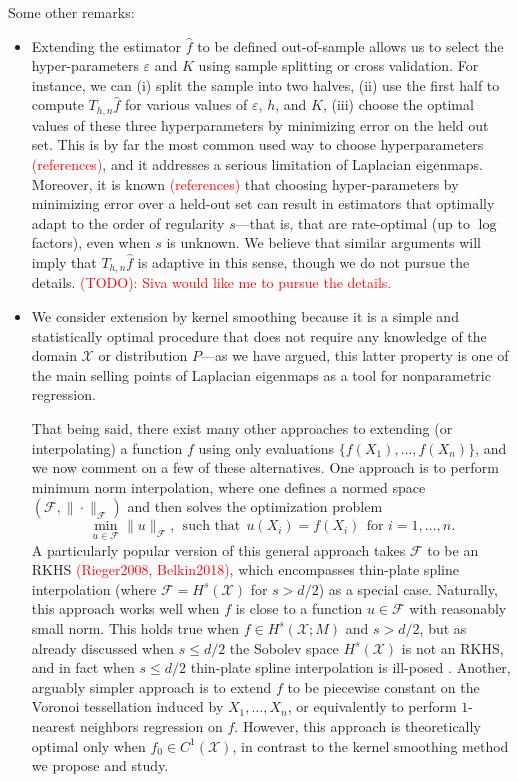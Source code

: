 \documentclass{article}
\newcommand{\1}{\mathbf{1}}
\newcommand{\mc}[1]{\mathcal{#1}}
\newcommand{\wh}[1]{\widehat{#1}}
\theoremstyle{alden}
\theoremstyle{aldenthm}
\theoremstyle{definition}
\theoremstyle{remark}
\begin{document}
Some other remarks:
\begin{itemize}
	\item Extending the estimator $\wh{f}$ to be defined out-of-sample allows us to select the hyper-parameters $\varepsilon$ and $K$ using sample splitting or cross validation. For instance, we can (i) split the sample into two halves, (ii) use the first half to compute $T_{h,n}\wh{f}$ for various values of $\varepsilon$, $h$, and $K$, (iii) choose the optimal values of these three hyperparameters by minimizing error on the held out set. This is by far the most common used way to choose hyperparameters \textcolor{red}{(references)}, and it addresses a serious limitation of Laplacian eigenmaps. Moreover, it is known \textcolor{red}{(references)} that choosing hyper-parameters by minimizing error over a held-out set can result in estimators that optimally adapt to the order of regularity $s$---that is, that are rate-optimal (up to $\log$ factors), even when $s$ is unknown. We believe that similar arguments will imply that $T_{h,n}\wh{f}$ is adaptive in this sense, though we do not pursue the details. \textcolor{red}{(TODO): Siva would like me to pursue the details.}
	\item We consider extension by kernel smoothing because it is a simple and statistically optimal procedure that does not require any knowledge of the domain $\mc{X}$ or distribution $P$---as we have argued, this latter property is one of the main selling points of Laplacian eigenmaps as a tool for nonparametric regression. 
	
	That being said, there exist many other approaches to extending (or interpolating) a function $f$ using only evaluations $\{f(X_1),\ldots,f(X_n)\}$, and we now comment on a few of these alternatives. One approach is to perform minimum norm interpolation, where one defines a normed space $(\mc{F},\|\cdot\|_{\mc{F}})$ and then solves the optimization problem
	\begin{equation*}
	\min_{u \in \mc{F}} \|u\|_{\mc{F}},~~\textrm{such that}~~ u(X_i) =  f(X_i)~~\textrm{for $i = 1,\ldots,n$.}
	\end{equation*}
	A particularly popular version of this general approach takes $\mc{F}$ to be an RKHS \textcolor{red}{(Rieger2008, Belkin2018)}, which encompasses thin-plate spline interpolation (where $\mc{F} = H^s(\mc{X})$ for $s > d/2$) as a special case. Naturally, this approach works well when $f$ is close to a function $u \in \mc{F}$ with reasonably small norm.  This holds true when $f \in H^s(\mc{X};M)$ and $s > d/2$, but as already discussed when $s \leq d/2$ the Sobolev space $H^s(\mc{X})$ is not an RKHS, and in fact when $s \leq d/2$ thin-plate spline interpolation is ill-posed \citep{green93}. Another, arguably simpler approach is to extend $f$ to be piecewise constant on the Voronoi tessellation induced by $X_1,\ldots,X_n$, or equivalently to perform $1$-nearest neighbors regression on $f$. However, this approach is theoretically optimal only when $f_0 \in C^1(\mc{X})$, in contrast to the kernel smoothing method we propose and study.
	

\end{itemize}
\end{document}
